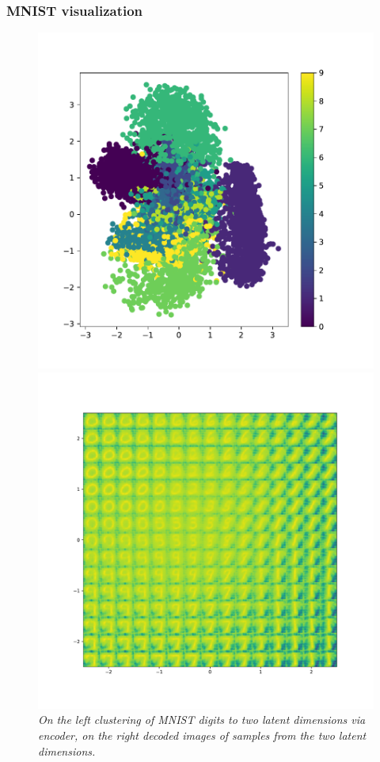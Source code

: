 \documentclass{beamer}
\begin{document}
\begin{frame}
\frametitle{MNIST visualization}
\begin{figure}
\begin{minipage}{0.45\linewidth}
	\includegraphics[scale=0.4]{ae_encoder.pdf}
\end{minipage}
\begin{minipage}{0.45\linewidth}
	\includegraphics[scale=0.24]{ae_decoder.pdf}
\end{minipage}
\caption{\it On the left clustering of MNIST digits to two latent dimensions via encoder, on the right decoded images of samples from the two latent dimensions.}
\end{figure}
\end{frame}
\end{document}
